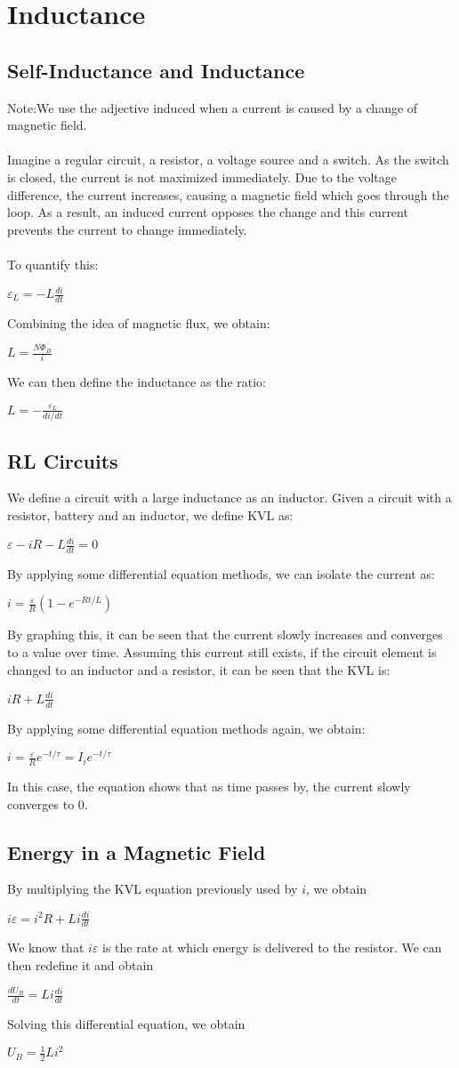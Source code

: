 \documentclass[12pt]{report}
\begin{document}
\chapter{Inductance}
	\section{Self-Inductance and Inductance}
		Note:We use the adjective induced when a current is caused by a change of magnetic field.\\
		\\
		Imagine a regular circuit, a resistor, a voltage source and a switch. As the switch is closed, the current is not maximized immediately. Due to the voltage difference, the current increases, causing a magnetic field which goes through the loop. As a result, an induced current opposes the change and this current prevents the current to change immediately.\\
		\\
		To quantify this:\\
		\centerline{$\varepsilon_L = -L\frac{di}{dt}$}
		Combining the idea of magnetic flux, we obtain:\\
		\centerline{$L = \frac{N\Phi_B}{i}$}
		We can then define the inductance as the ratio:\\
		\centerline{$L = -\frac{\varepsilon_L}{di/dt}$}
	\section{RL Circuits}
		We define a circuit with a large inductance as an inductor. Given a circuit with a resistor, battery and an inductor, we define KVL as:\\
		\centerline{$\varepsilon - iR - L\frac{di}{dt} = 0$}
		By applying some differential equation methods, we can isolate the current as:\\
		\centerline{$ i = \frac{\varepsilon}{R} (1 - e^{-Rt/L})$}
		By graphing this, it can be seen that the current slowly increases and converges to a value over time. Assuming this current still exists, if the circuit element is changed to an inductor and a resistor, it can be seen that the KVL is:\\
		\centerline{$iR + L\frac{di}{dt}$}
		By applying some differential equation methods again, we obtain:\\
		\centerline{$i = \frac{\varepsilon}{R}e^{-t/\tau} = I_ie^{-t/\tau}$}
		In this case, the equation shows that as time passes by, the current slowly converges to 0.
	\section{Energy in a Magnetic Field}
		By multiplying the KVL equation previously used by $i$, we obtain\\
		\centerline{$i\varepsilon = i^2R + Li\frac{di}{dt}$}
		We know that $i\varepsilon$ is the rate at which energy is delivered to the resistor. We can then redefine it and obtain\\
		\centerline{$\frac{dU_B}{dt} = Li\frac{di}{dt}$}
		Solving this differential equation, we obtain\\
		\centerline{$U_B = \frac{1}{2} Li^2$}
\end{document}
